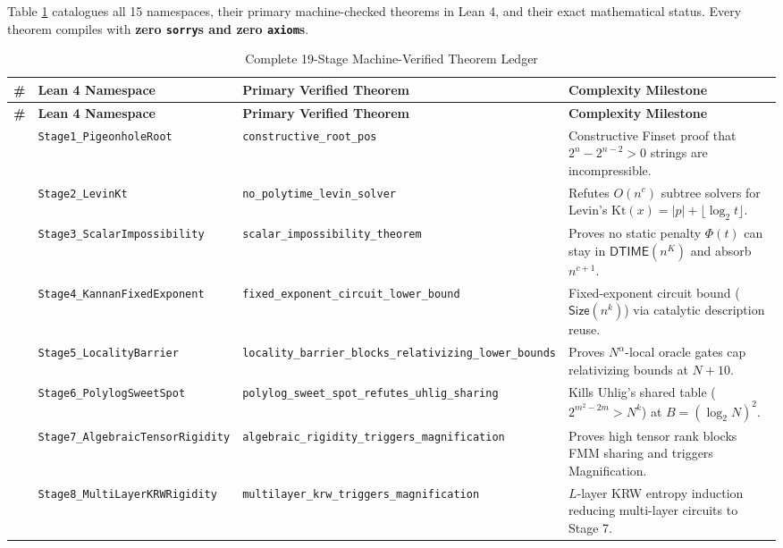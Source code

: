 \documentclass[11pt,a4paper]{article}
\theoremstyle{plain}
\theoremstyle{definition}
\theoremstyle{remark}
\newcommand{\lean}[1]{\texttt{\textcolor{slate}{#1}}}
\newcommand{\DTIME}{\mathsf{DTIME}}
\newcommand{\Size}{\mathsf{Size}}
\newcommand{\Kt}{\mathrm{Kt}}
\begin{document}
Table \ref{tab:ledger} catalogues all 15 namespaces, their primary machine-checked theorems in Lean 4, and their exact mathematical status. Every theorem compiles with \textbf{zero \lean{sorry}s and zero \lean{axiom}s}.

\begin{longtable}{@{}p{}p{}p{}p{}@{}}
\caption{Complete 19-Stage Machine-Verified Theorem Ledger}\label{tab:ledger}\\
\toprule
\textbf{\#} & \textbf{Lean 4 Namespace} & \textbf{Primary Verified Theorem} & \textbf{Complexity Milestone} \\
\midrule
\endfirsthead
\toprule
\textbf{\#} & \textbf{Lean 4 Namespace} & \textbf{Primary Verified Theorem} & \textbf{Complexity Milestone} \\
\midrule
\endhead
\bottomrule
\endfoot
1 & \lean{Stage1\_PigeonholeRoot} & \lean{constructive\_root\_pos} & Constructive Finset proof that $2^n - 2^{n-2} > 0$ strings are incompressible. \\
\addlinespace
2 & \lean{Stage2\_LevinKt} & \lean{no\_polytime\_levin\_solver} & Refutes $O(n^c)$ subtree solvers for Levin's $\Kt(x) = |p| + \lfloor\log_2 t\rfloor$. \\
\addlinespace
3 & \lean{Stage3\_ScalarImpossibility} & \lean{scalar\_impossibility\_theorem} & Proves no static penalty $\Phi(t)$ can stay in $\DTIME(n^K)$ and absorb $n^{c+1}$. \\
\addlinespace
4 & \lean{Stage4\_KannanFixedExponent} & \lean{fixed\_exponent\_circuit\_lower\_bound} & Fixed-exponent circuit bound ($\Size(n^k)$) via catalytic description reuse. \\
\addlinespace
5 & \lean{Stage5\_LocalityBarrier} & \lean{locality\_barrier\_blocks\_relativizing\_lower\_bounds} & Proves $N^\alpha$-local oracle gates cap relativizing bounds at $N + 10$. \\
\addlinespace
6 & \lean{Stage6\_PolylogSweetSpot} & \lean{polylog\_sweet\_spot\_refutes\_uhlig\_sharing} & Kills Uhlig's shared table ($2^{m^2-2m} > N^k$) at $B = (\log_2 N)^2$. \\
\addlinespace
7 & \lean{Stage7\_AlgebraicTensorRigidity} & \lean{algebraic\_rigidity\_triggers\_magnification} & Proves high tensor rank blocks FMM sharing and triggers Magnification. \\
\addlinespace
8 & \lean{Stage8\_MultiLayerKRWRigidity} & \lean{multilayer\_krw\_triggers\_magnification} & $L$-layer KRW entropy induction reducing multi-layer circuits to Stage 7. \\

\end{longtable}
\end{document}
